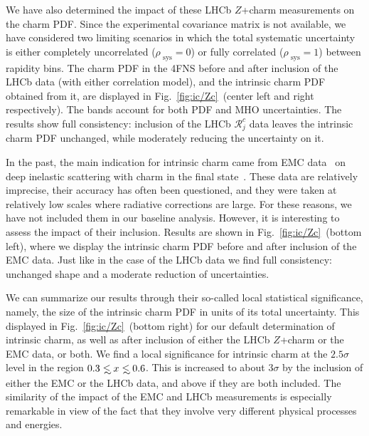  We have also determined the impact of these LHCb $Z$+charm measurements on the
charm PDF.
%
Since the experimental covariance matrix is not available,
we have considered two limiting scenarios in which the total
systematic uncertainty is either completely uncorrelated 
($\rho_\textrm{ sys}=0$) or fully correlated  ($\rho_\textrm{ sys}=1$) between
 rapidity bins. The charm PDF in the 4FNS before and after
inclusion of the LHCb data (with either correlation model), and the intrinsic
charm PDF obtained from it, are displayed in
Fig.~\ref{fig:ic/Zc}~(center left and right respectively).
%
The bands account for both PDF and MHO uncertainties.
%
The results show full consistency: inclusion of the LHCb  $\mathcal{R}_j^c$ data leaves
the intrinsic charm PDF unchanged, while moderately reducing the
uncertainty on it.

In the past, the main indication for  intrinsic charm came from EMC data~\cite{Aubert:1982tt} on deep inelastic scattering with charm in the final state~\cite{Harris:1995jx}.
%
These data are relatively imprecise, their accuracy has often been questioned,
and they were taken at relatively low scales where radiative corrections are large.
%
For these reasons, we have not included them in our baseline
analysis.
%
However, it is interesting to assess the impact of
their inclusion.
%
Results are shown in 
Fig.~\ref{fig:ic/Zc}~(bottom left), where we display the
intrinsic charm PDF before and after inclusion of the EMC data.
%
Just
like in the case of the LHCb data we find full consistency: unchanged
shape and a moderate reduction of uncertainties.

We can summarize our results  through their so-called local statistical
significance, namely, the size of the intrinsic charm PDF
in units of its total uncertainty.
%
This displayed  in Fig.~\ref{fig:ic/Zc}~(bottom right) for our default determination of
intrinsic charm, as well as after inclusion of either the LHCb $Z$+charm or the
EMC data, or both.
%
We find a local significance for intrinsic charm at the $2.5\sigma$ level
in the region $0.3 \lsim x \lsim 0.6$.
%
This is increased to about
$3\sigma$ by the inclusion of either the EMC or the LHCb
data, and above if they are both included.
%
The similarity of the impact of the EMC and LHCb measurements is
especially remarkable in view of the fact that they involve very
different physical processes and energies.

